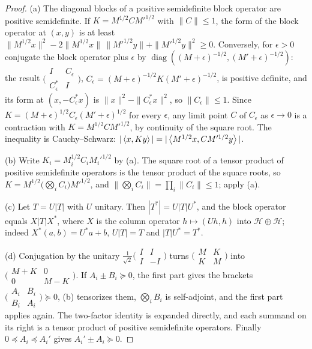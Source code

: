 \begin{proof}
(a) The diagonal blocks of a positive semidefinite block operator are positive
semidefinite. If $K=M^{1/2}CM'^{1/2}$ with $\|C\|\le1$, the form of the block
operator at $(x,y)$ is at least
$\|M^{1/2}x\|^2-2\|M^{1/2}x\|\,\|M'^{1/2}y\|+\|M'^{1/2}y\|^2\ge0$. Conversely,
for $\epsilon>0$ conjugate the block operator plus $\epsilon$ by
$\operatorname{diag}((M+\epsilon)^{-1/2},(M'+\epsilon)^{-1/2})$: the result
$\bigl(\begin{smallmatrix}I&C_\epsilon\\ C_\epsilon^*&I\end{smallmatrix}\bigr)$,
$C_\epsilon=(M+\epsilon)^{-1/2}K(M'+\epsilon)^{-1/2}$, is positive definite,
and its form at $(x,-C_\epsilon^*x)$ is $\|x\|^2-\|C_\epsilon^*x\|^2$, so
$\|C_\epsilon\|\le1$. Since $K=(M+\epsilon)^{1/2}C_\epsilon(M'+\epsilon)^{1/2}$
for every $\epsilon$, any limit point $C$ of $C_\epsilon$ as $\epsilon\to0$ is a
contraction with $K=M^{1/2}CM'^{1/2}$, by continuity of the square root. The
inequality is Cauchy--Schwarz: $|\left\langle x,Ky\right\rangle|=|\left\langle M^{1/2}x,CM'^{1/2}y\right\rangle|$.

(b) Write $K_i=M_i^{1/2}C_iM_i'^{1/2}$ by (a). The square root of a tensor
product of positive semidefinite operators is the tensor product of the square
roots, so $K=M^{1/2}\big(\bigotimes_iC_i\big)M'^{1/2}$, and
$\|\bigotimes_iC_i\|=\prod_i\|C_i\|\le1$; apply (a).

(c) Let $T=U|T|$ with $U$ unitary. Then $|T^*|=U|T|U^*$, and the block operator
equals $X|T|X^*$, where $X$ is the column operator $h\mapsto(Uh,h)$ into
$\mathcal H\oplus\mathcal H$; indeed $X^*(a,b)=U^*a+b$, $U|T|=T$ and
$|T|U^*=T^*$.

(d) Conjugation by the unitary
$\frac1{\sqrt2}\bigl(\begin{smallmatrix}I&I\\ I&-I\end{smallmatrix}\bigr)$ turns
$\bigl(\begin{smallmatrix}M&K\\ K&M\end{smallmatrix}\bigr)$ into
$\bigl(\begin{smallmatrix}M+K&0\\ 0&M-K\end{smallmatrix}\bigr)$. If
$A_i\pm B_i\succeq0$, the first part gives the brackets
$\bigl(\begin{smallmatrix}A_i&B_i\\ B_i&A_i\end{smallmatrix}\bigr)\succeq0$, (b)
tensorizes them, $\bigotimes_iB_i$ is self-adjoint, and the first part applies
again. The two-factor identity is expanded directly, and each summand on its
right is a tensor product of positive semidefinite operators. Finally
$0\preceq A_i\preceq A_i'$ gives $A_i'\pm A_i\succeq0$.
\end{proof}

